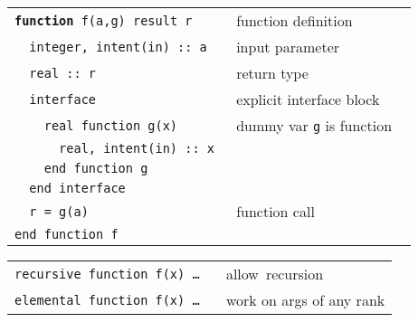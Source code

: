 \documentclass[8pt]{extarticle} %
\begin{document}
\begin{multicols}{3}
  \begin{tabular}{L{0.55\linewidth} L{0.45\linewidth}}
  \tt \textbf{function}~f(a,g) result r     & function definition            \\
  \tt ~~integer,~intent(in)~::~a            & input parameter                \\
  \tt ~~real~::~r                           & return type                    \\
  \tt ~~interface                           & explicit interface block       \\
  \tt ~~~~real~function~g(x)                & dummy var {\tt g} is function  \\
  \tt ~~~~~~real,~intent(in)~::~x           &                                \\
  \tt ~~~~end~function~g                    &                                \\
  \tt ~~end~interface                       &                                \\
  \tt ~~r = g(a)                            & function call                  \\
  \tt end~function~f                        &
  \end{tabular}
  \begin{tabular}{L{0.55\linewidth} L{0.45\linewidth}}
  \tt recursive~function f(x)~\dots & allow~recursion \\
  \tt elemental~function f(x)~\dots & work on args of any rank
  \end{tabular}


\end{multicols}
\end{document}
